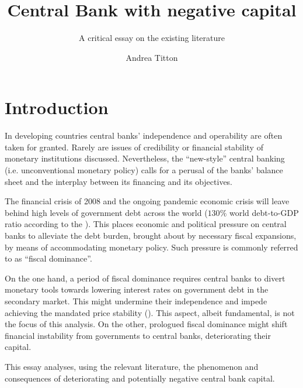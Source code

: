 \documentclass[american]{scrartcl}
\title{Central Bank with negative capital} %
\subtitle{A critical essay on the existing literature}
\author{Andrea Titton}
\begin{document}
\clearpage
\thispagestyle{empty}
\maketitle
\clearpage


\iffalse
    History | Theory of CB dividends | Financial stability under deferred assets |
    Expectations of Inflation | Effects on global banks
\fi


\section{Introduction}

In developing countries central banks' independence and operability are often taken for granted. Rarely are issues of credibility or financial stability of monetary institutions discussed. Nevertheless, the ``new-style'' central banking (i.e. unconventional monetary policy) calls for a perusal of the banks' balance sheet and the interplay between its financing and its objectives.

The financial crisis of 2008 and the ongoing pandemic economic crisis will leave behind high levels of government debt across the world ($130\%$ world debt-to-GDP ratio according to the \cite{WEO2020}). This places economic and political pressure on central banks to alleviate the debt burden, brought about by necessary fiscal expansions, by means of accommodating monetary policy. Such pressure is commonly referred to as ``fiscal dominance''.

On the one hand, a period of fiscal dominance requires central banks to divert monetary tools towards lowering interest rates on government debt in the secondary market. This might undermine their independence and impede achieving the mandated price stability (\cite{Schnabel2020}). This aspect, albeit fundamental, is not the focus of this analysis. On the other, prologued fiscal dominance might shift financial instability from governments to central banks, deteriorating their capital. %

This essay analyses, using the relevant literature, the phenomenon and consequences of deteriorating and potentially negative central bank capital. %

\newpage
\nocite{*}
\printbibliography
\end{document}
